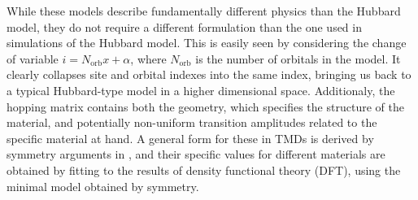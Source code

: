 While these models describe fundamentally different physics than the Hubbard model, they do not require a different formulation than the one used in simulations of the Hubbard model.
This is easily seen by considering the change of variable $i = N_{\text{orb}} x + \alpha$, where $N_{\text{orb}}$ is the number of orbitals in the model.
It clearly collapses site and orbital indexes into the same index, bringing us back to a typical Hubbard-type model in a higher dimensional space.
Additionaly, the hopping matrix contains both the geometry, which specifies the  structure of the material, and potentially non-uniform transition amplitudes related to the specific material at hand.
A general form for these in \acp{TMD} is derived by symmetry arguments in \cite{liu_three-band_2013}, and their specific values for different materials are obtained by fitting to the results of  density functional theory (DFT), using the minimal model obtained by symmetry.
